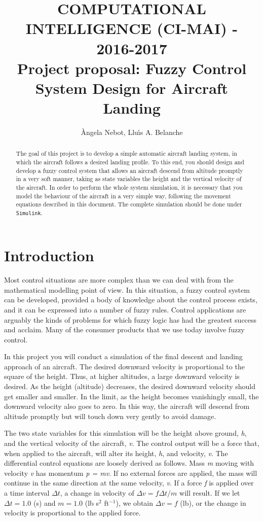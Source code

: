 \documentclass{article}
\title{COMPUTATIONAL INTELLIGENCE (CI-MAI) - 2016-2017\\
Project proposal: Fuzzy Control System Design for Aircraft Landing}
\author{\`Angela Nebot, Llu\'{\i}s A. Belanche}
\begin{document}
\maketitle


\begin{abstract}
  The goal of this project is to develop a simple automatic aircraft
  landing system, in which the aircraft follows a desired landing
  profile. To this end, you should design and develop a fuzzy control
  system that allows an aircraft descend from altitude promptly
  in a very soft manner, taking as state variables the height and the
  vertical velocity of the aircraft. In order to perform the whole
  system simulation, it is necessary that you model the behaviour of
  the aircraft in a very simple way, following the movement equations
  described in this document. The complete simulation should be done
  under \texttt{Simulink}.
\end{abstract}

\section{Introduction}

Most control situations are more complex than we can deal with from
the mathematical modelling point of view. In this situation, a fuzzy
control system can be developed, provided a body of knowledge about the
control process exists, and it can be expressed into a number of fuzzy
rules. Control applications are arguably the kinds of problems for which fuzzy
logic has had the greatest success and acclaim. Many of the consumer
products that we use today involve fuzzy control.

In this project you will conduct a simulation of the final descent and
landing approach of an aircraft. The desired downward velocity is
proportional to the square of the height. Thus, at higher altitudes, a
large downward velocity is desired. As the height (altitude)
decreases, the desired downward velocity should get smaller and smaller. In
the limit, as the height becomes vanishingly small, the downward
velocity also goes to zero. In this way, the aircraft will descend
from altitude promptly but will touch down very gently to avoid
damage.

The two state variables for this simulation will be the height above
ground, {\em h}, and the vertical velocity of the aircraft, {\em
  v}. The control output will be a force that, when applied to the
aircraft, will alter its height, {\em h}, and velocity, {\em v}. The
differential control equations are loosely derived as follows. Mass
{\em m} moving with velocity {\em v} has momentum {\em p = mv}. If no
external forces are applied, the mass will continue in the same
direction at the same velocity, {\em v}. If a force {\em f} is applied
over a time interval $\Delta t$, a change in velocity of
$ \Delta v = f \Delta t/m$ will result. If we let $\Delta t = 1.0$ (s)
and $m = 1.0 $ (lb s$^2$ ft$^{-1}$), we obtain $\Delta v = f$ (lb), or
the change in velocity is proportional to the applied force.
\end{document}
